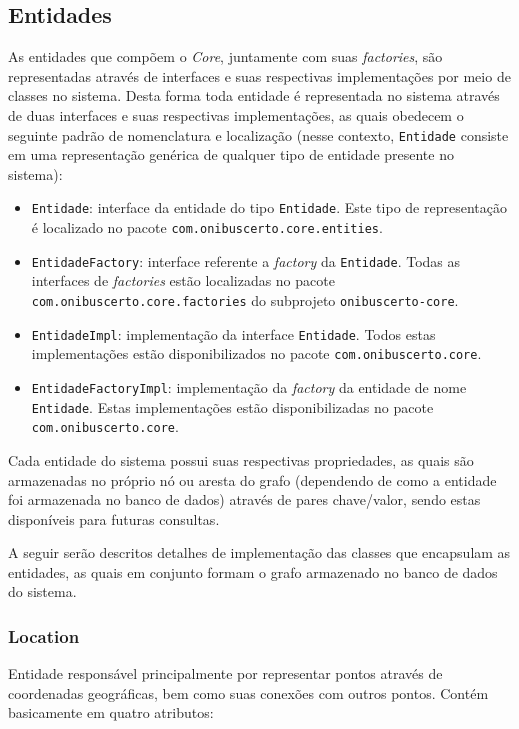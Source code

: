 \subsection{Entidades}
As entidades que compõem o \emph{Core}, juntamente com suas \emph{factories}, são representadas através de interfaces e suas respectivas implementações por meio de classes no sistema. 
Desta forma toda entidade é representada no sistema através de duas interfaces e suas respectivas implementações, as quais obedecem o seguinte padrão de nomenclatura e localização (nesse contexto, \texttt{Entidade} consiste em uma representação genérica de qualquer tipo de entidade presente no sistema):
\begin{itemize}
	\item \texttt{Entidade}: interface da entidade do tipo \texttt{Entidade}.
		  Este tipo de representação é localizado no pacote \texttt{com.onibuscerto.core.entities}.
	\item \texttt{EntidadeFactory}: interface referente a \emph{factory} da \texttt{Entidade}.
		  Todas as interfaces de \emph{factories} estão localizadas no pacote \texttt{com.onibuscerto.core.factories} do subprojeto \texttt{onibuscerto-core}.
	\item \texttt{EntidadeImpl}: implementação da interface \texttt{Entidade}.
		  Todos estas implementações estão disponibilizados no pacote \texttt{com.onibuscerto.core}.
	\item \texttt{EntidadeFactoryImpl}: implementação da \emph{factory} da entidade de nome \texttt{Entidade}.
		  Estas implementações estão disponibilizadas no pacote \texttt{com.onibuscerto.core}.
\end{itemize}

Cada entidade do sistema possui suas respectivas propriedades, as quais são armazenadas no próprio nó ou aresta do grafo (dependendo de como a entidade foi armazenada no banco de dados) através de pares chave/valor, sendo estas disponíveis para futuras consultas.

A seguir serão descritos detalhes de implementação das classes que encapsulam as entidades, as quais em conjunto formam o grafo armazenado no banco de dados do sistema.

\subsubsection{Location}
Entidade responsável principalmente por representar pontos através de coordenadas geográficas, bem como suas conexões com outros pontos.
Contém basicamente em quatro atributos: 

